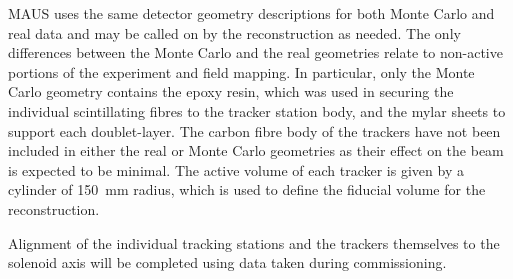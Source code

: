   MAUS uses the same detector geometry descriptions for both Monte Carlo and real data and may be called on by the reconstruction as needed.  The only differences between the Monte Carlo and the real geometries relate to non-active portions of the experiment and field mapping. In particular, only the Monte Carlo geometry contains the epoxy resin, which was used in securing the individual scintillating fibres to the tracker station body, and the mylar sheets to support each doublet-layer. The carbon fibre body of the trackers have not been included in either the real or Monte Carlo geometries as their effect on the beam is expected to be minimal. The active volume of each tracker is given by a cylinder of 150~mm radius, which is used to define the fiducial volume for the reconstruction.
  
  Alignment of the individual tracking stations and the trackers themselves to the solenoid axis will be completed using data taken during commissioning.
  
  
